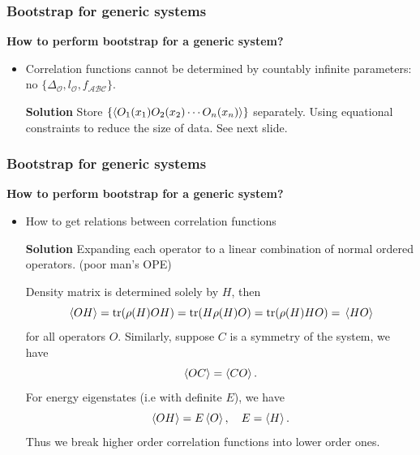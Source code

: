 \documentclass{beamer}
\begin{document}
\begin{frame}
\frametitle{Bootstrap for generic systems}

\textbf{How to perform bootstrap for a generic system?}    

\begin{itemize}
    \item Correlation functions cannot be determined by countably infinite parameters: 
    no $\{\Delta_{\mathcal{O}}, l_{\mathcal{O}}, f_{\mathcal{A} \mathcal{B} \mathcal{C}}\}$.
    
    \textbf{Solution} Store $\{\expval{O_1(x_1) O_2(x_2) \cdots O_n (x_n)}\}$ separately. 
    Using equational constraints to reduce the size of data.
    See next slide.
\end{itemize}

\end{frame}

\begin{frame}
\frametitle{Bootstrap for generic systems}

\textbf{How to perform bootstrap for a generic system?}  

\begin{itemize}
    \item How to get relations between correlation functions

    \textbf{Solution} Expanding each operator to a linear combination of normal ordered operators. (poor man's OPE)
    
    Density matrix is determined solely by $H$, then 
    \begin{equation}
        \expval*{O H} = \trace (\rho(H) O H) = \trace(H \rho(H) O) = \trace(\rho(H) H O)  = \expval*{H {O}}
    \end{equation}
    for all operators $O$. Similarly, suppose $C$ is a symmetry of the system, we have 
    \begin{equation}
        \expval{OC} = \expval{CO}.
    \end{equation}
    For energy eigenstates (i.e with definite $E$), we have 
    \begin{equation}
        \expval{O H} = E \expval{O}, \quad E = \expval{H}.
    \end{equation}
    Thus we break higher order correlation functions into lower order ones.
\end{itemize}

\end{frame}
\end{document}
